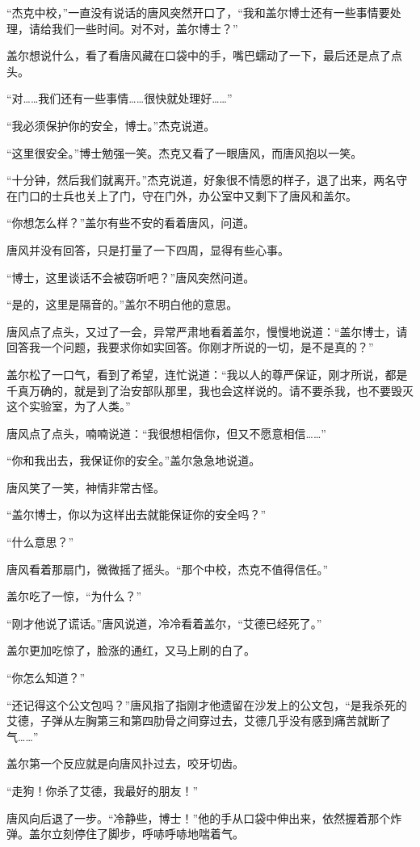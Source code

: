 “杰克中校，”一直没有说话的唐风突然开口了，“我和盖尔博士还有一些事情要处理，请给我们一些时间。对不对，盖尔博士？”

盖尔想说什么，看了看唐风藏在口袋中的手，嘴巴蠕动了一下，最后还是点了点头。

“对……我们还有一些事情……很快就处理好……”

“我必须保护你的安全，博士。”杰克说道。

“这里很安全。”博士勉强一笑。杰克又看了一眼唐风，而唐风抱以一笑。

“十分钟，然后我们就离开。”杰克说道，好象很不情愿的样子，退了出来，两名守在门口的士兵也关上了门，守在门外，办公室中又剩下了唐风和盖尔。

“你想怎么样？”盖尔有些不安的看着唐风，问道。

唐风并没有回答，只是打量了一下四周，显得有些心事。

“博士，这里谈话不会被窃听吧？”唐风突然问道。

“是的，这里是隔音的。”盖尔不明白他的意思。

唐风点了点头，又过了一会，异常严肃地看着盖尔，慢慢地说道：“盖尔博士，请回答我一个问题，我要求你如实回答。你刚才所说的一切，是不是真的？”

盖尔松了一口气，看到了希望，连忙说道：“我以人的尊严保证，刚才所说，都是千真万确的，就是到了治安部队那里，我也会这样说的。请不要杀我，也不要毁灭这个实验室，为了人类。”

唐风点了点头，喃喃说道：“我很想相信你，但又不愿意相信……”

“你和我出去，我保证你的安全。”盖尔急急地说道。

唐风笑了一笑，神情非常古怪。

“盖尔博士，你以为这样出去就能保证你的安全吗？”

“什么意思？”

唐风看着那扇门，微微摇了摇头。“那个中校，杰克不值得信任。”

盖尔吃了一惊，“为什么？”

“刚才他说了谎话。”唐风说道，冷冷看着盖尔，“艾德已经死了。”

盖尔更加吃惊了，脸涨的通红，又马上刷的白了。

“你怎么知道？”

“还记得这个公文包吗？”唐风指了指刚才他遗留在沙发上的公文包，“是我杀死的艾德，子弹从左胸第三和第四肋骨之间穿过去，艾德几乎没有感到痛苦就断了气……”

盖尔第一个反应就是向唐风扑过去，咬牙切齿。

“走狗！你杀了艾德，我最好的朋友！”

唐风向后退了一步。“冷静些，博士！”他的手从口袋中伸出来，依然握着那个炸弹。盖尔立刻停住了脚步，呼哧呼哧地喘着气。

